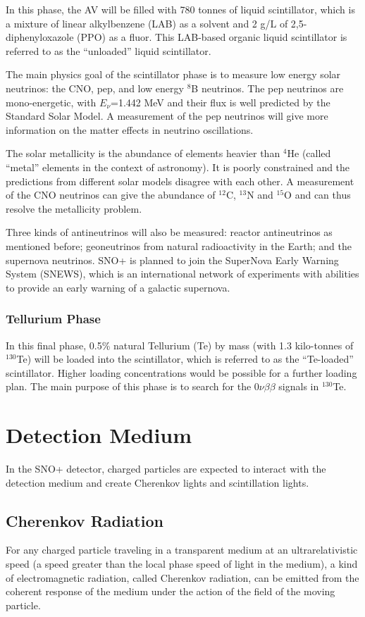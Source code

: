In this phase, the AV will be filled with 780 tonnes of liquid scintillator, which is a mixture of linear alkylbenzene (LAB) as a solvent and 2 g/L of 2,5-diphenyloxazole (PPO) as a fluor. This LAB-based organic liquid scintillator is referred to as the ``unloaded'' liquid scintillator.

The main physics goal of the scintillator phase is to measure low energy solar neutrinos: the CNO, pep, and low energy $^8$B neutrinos. The pep neutrinos are mono-energetic, with $E_\nu$=1.442 MeV and their flux is well predicted by the Standard Solar Model\cite{davini2016cno}. A measurement of the pep neutrinos will give more information on the matter effects in neutrino oscillations. 

The solar metallicity is the abundance of elements heavier than $^4$He (called ``metal'' elements in the context of astronomy). It is poorly constrained and the predictions from different solar models disagree with each other. A measurement of the CNO neutrinos can give the abundance of $^{12}$C, $^{13}$N and $^{15}$O and can thus resolve the metallicity problem\cite{cerdeno2018cno}.

Three kinds of antineutrinos will also be measured: reactor antineutrinos as mentioned before; geoneutrinos from natural radioactivity in the Earth; and the supernova neutrinos. SNO+ is planned to join the SuperNova Early Warning System (SNEWS), which is an international network of experiments with abilities to provide an early warning of a galactic supernova\cite{snop_nim}.

\subsubsection{Tellurium Phase}
In this final phase, 0.5\% natural Tellurium (Te) by mass (with 1.3 kilo-tonnes of $^{130}$Te) will be loaded into the scintillator, which is referred to as the ``Te-loaded'' scintillator. Higher loading concentrations would be possible for a further loading plan\cite{Paton:2019kgy}. The main purpose of this phase is to search for the $0\nu\beta\beta$ signals in $^{130}$Te.

\section{Detection Medium}
In the SNO+ detector, charged particles are expected to interact with the detection medium and create Cherenkov lights and scintillation lights. 

\subsection{Cherenkov Radiation}
For any charged particle traveling in a transparent medium at an ultrarelativistic speed (a speed greater than the local phase speed of light in the medium),  a kind of electromagnetic radiation, called Cherenkov radiation, can be emitted from the coherent response of the medium under the action of the field of the moving particle\cite{jackson2007classical,landau2013electrodynamics}.

